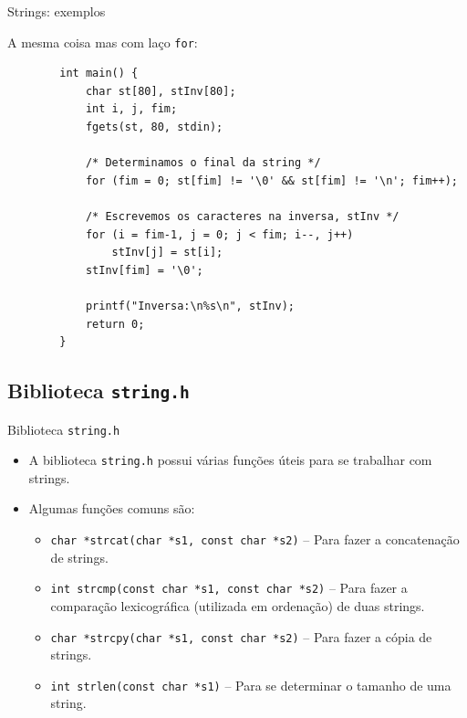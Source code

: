 \documentclass[handout]{beamer}
\newcommand{\cod}[1]{\texttt{#1}}
\begin{document}
\begin{frame}[fragile]{Strings: exemplos}

    A mesma coisa mas com laço \cod{for}:

    \begin{verbatim}
        int main() {
            char st[80], stInv[80];
            int i, j, fim;
            fgets(st, 80, stdin);

            /* Determinamos o final da string */
            for (fim = 0; st[fim] != '\0' && st[fim] != '\n'; fim++);

            /* Escrevemos os caracteres na inversa, stInv */
            for (i = fim-1, j = 0; j < fim; i--, j++)
                stInv[j] = st[i];
            stInv[fim] = '\0';

            printf("Inversa:\n%s\n", stInv);
            return 0;
        }
    \end{verbatim}

\end{frame}


\subsection{Biblioteca \texttt{string.h}}

\begin{frame}[fragile]{Biblioteca \texttt{string.h}}

    \begin{itemize}
        \item A biblioteca \cod{string.h} possui várias funções úteis para se trabalhar com strings.
        \item Algumas funções comuns são:
        \begin{itemize}
            \item \cod{char *strcat(char *s1, const char *s2)} -- Para fazer a concatenação de strings.
            \item \cod{int strcmp(const char *s1, const char *s2)} -- Para fazer a comparação lexicográfica (utilizada em ordenação) de duas strings.
            \item \cod{char *strcpy(char *s1, const char *s2)} -- Para fazer a cópia de strings.
            \item \cod{int strlen(const char *s1)} -- Para se determinar o tamanho de uma string.
        \end{itemize}
    \end{itemize}

\end{frame}
\end{document}
